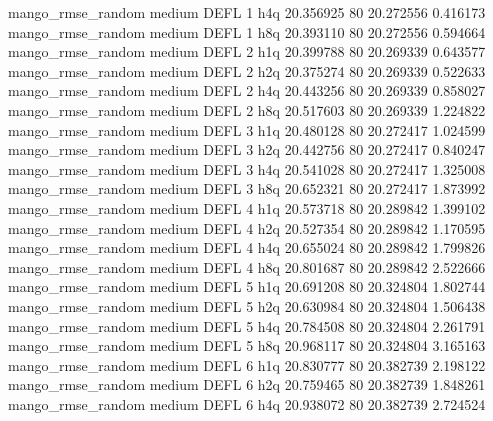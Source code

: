 mango_rmse_random     medium     DEFL                 1                  h4q 20.356925 80      20.272556           0.416173
mango_rmse_random     medium     DEFL                 1                  h8q 20.393110 80      20.272556           0.594664
mango_rmse_random     medium     DEFL                 2                  h1q 20.399788 80      20.269339           0.643577
mango_rmse_random     medium     DEFL                 2                  h2q 20.375274 80      20.269339           0.522633
mango_rmse_random     medium     DEFL                 2                  h4q 20.443256 80      20.269339           0.858027
mango_rmse_random     medium     DEFL                 2                  h8q 20.517603 80      20.269339           1.224822
mango_rmse_random     medium     DEFL                 3                  h1q 20.480128 80      20.272417           1.024599
mango_rmse_random     medium     DEFL                 3                  h2q 20.442756 80      20.272417           0.840247
mango_rmse_random     medium     DEFL                 3                  h4q 20.541028 80      20.272417           1.325008
mango_rmse_random     medium     DEFL                 3                  h8q 20.652321 80      20.272417           1.873992
mango_rmse_random     medium     DEFL                 4                  h1q 20.573718 80      20.289842           1.399102
mango_rmse_random     medium     DEFL                 4                  h2q 20.527354 80      20.289842           1.170595
mango_rmse_random     medium     DEFL                 4                  h4q 20.655024 80      20.289842           1.799826
mango_rmse_random     medium     DEFL                 4                  h8q 20.801687 80      20.289842           2.522666
mango_rmse_random     medium     DEFL                 5                  h1q 20.691208 80      20.324804           1.802744
mango_rmse_random     medium     DEFL                 5                  h2q 20.630984 80      20.324804           1.506438
mango_rmse_random     medium     DEFL                 5                  h4q 20.784508 80      20.324804           2.261791
mango_rmse_random     medium     DEFL                 5                  h8q 20.968117 80      20.324804           3.165163
mango_rmse_random     medium     DEFL                 6                  h1q 20.830777 80      20.382739           2.198122
mango_rmse_random     medium     DEFL                 6                  h2q 20.759465 80      20.382739           1.848261
mango_rmse_random     medium     DEFL                 6                  h4q 20.938072 80      20.382739           2.724524
